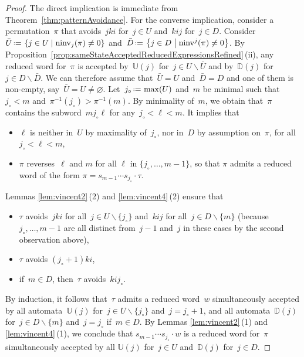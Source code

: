 \documentclass[ALCO]{cedram}
\newcommand{\set}[2]{\left\{ #1 \;\middle|\; #2 \right\}}
\newcommand{\ssm}{\smallsetminus}
\newcommand{\eqdef}{\mbox{\,\raisebox{0.2ex}{\scriptsize\ensuremath{\mathrm:}}\ensuremath{=}\,}}
\DeclareMathOperator{\ninv}{ninv}
\newcommand{\automatonU}{\mathbb{U}}
\newcommand{\automatonD}{\mathbb{D}}
\begin{document}
\begin{proof}
The direct implication is immediate from Theorem~\ref{thm:patternAvoidance}.
For the converse implication, consider a permutation~$\pi$ that avoids~$jki$ for~$j \in U$ and~$kij$ for~$j \in D$.
Consider $\bar U \eqdef \set{j \in U}{\ninv_j(\pi) \ne 0}$ and~$\bar D \eqdef \set{j \in D}{\ninv^j(\pi) \ne 0}$.
By Proposition~\ref{prop:sameStateAcceptedReducedExpressionsRefined}\,(ii), any reduced word for~$\pi$ is accepted by~$\automatonU(j)$ for~$j \in U \ssm \bar U$ and by~$\automatonD(j)$ for~$j \in D \ssm \bar D$.
We can therefore assume that~$\bar U = U$ and~$\bar D = D$ and one of them is non-empty, say~$\bar U = U \ne \varnothing$.
Let~$j_\circ \eqdef \max(U)$ and~$m$ be minimal such that~$j_\circ < m$ and~$\pi^{-1}(j_\circ) > \pi^{-1}(m)$.
By minimality of~$m$, we obtain that~$\pi$ contains the subword~$mj_\circ\ell$ for any~$j_\circ < \ell < m$.
It implies that
\begin{itemize}
\item $\ell$ is neither in~$U$ by maximality of~$j_\circ$, nor in~$D$ by assumption on~$\pi$, for all~$j_\circ < \ell < m$,
\item $\pi$ reverses~$\ell$ and $m$ for all $\ell$ in $\{j_\circ,\dots,m-1\}$, so that $\pi$ admits a reduced word of the form $\pi = s_{m-1} \cdots s_{j_\circ} \cdot \tau$.
\end{itemize}
Lemmas \ref{lem:vincent2}\,(2) and \ref{lem:vincent4}\,(2) ensure that
\begin{itemize}
\item $\tau$ avoids~$jki$ for all~$j \in U \ssm \{j_\circ\}$ and~$kij$ for all~$j \in D \ssm \{m\}$ (because~$j_\circ, \dots, m-1$ are all distinct from~$j-1$ and~$j$ in these cases by the second observation above),
\item $\tau$ avoids $(j_\circ+1)ki$,
\item if~$m \in D$, then~$\tau$ avoids~$kij_\circ$.
\end{itemize}
By induction, it follows that~$\tau$ admits a reduced word~$w$ simultaneously accepted by all automata~$\automatonU(j)$ for~$j \in U \ssm \{j_\circ\}$ and~$j = j_\circ + 1$, and all automata~$\automatonD(j)$ for~$j \in D \ssm \{m\}$ and~$j = j_\circ$ if~$m \in D$.
By Lemmas \ref{lem:vincent2}\,(1) and \ref{lem:vincent4}\,(1), we conclude that $s_{m-1} \cdots s_{j_\circ} \cdot w$ is a reduced word for~$\pi$ simultaneously accepted by all $\automatonU(j)$ for~$j \in U$ and~$\automatonD(j)$ for~$j \in D$.
\end{proof}
\end{document}
